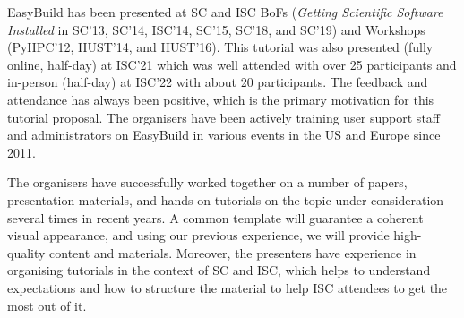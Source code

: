 EasyBuild has been presented at SC and ISC BoFs (\emph{Getting Scientific Software Installed} in SC'13, SC'14, ISC'14,
SC'15, SC'18, and SC'19) and Workshops (PyHPC'12, HUST'14, and HUST'16). This tutorial was also presented
(fully online, half-day) at ISC'21 which was well attended with over 25 participants and in-person (half-day) at ISC'22 with about 20 participants.
The feedback and attendance has always been positive, which is the primary motivation for this tutorial proposal. The organisers have been actively training user support staff and administrators on EasyBuild in various events in the US and Europe since 2011.

The organisers have successfully worked together on a number of papers, presentation materials,
and hands-on tutorials on the topic under consideration several times in recent years.
A common template
will guarantee
a coherent visual appearance, and using our previous experience, we will provide high-quality content and materials. Moreover, the presenters have experience in organising tutorials in the context of SC and ISC, which helps to understand
expectations
and how to structure the material
to help ISC attendees to get the most out of it.





